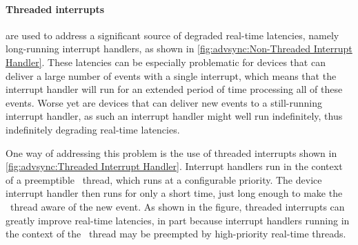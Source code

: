 
\paragraph{Threaded interrupts}
are used to address a significant source of degraded real-time latencies,
namely long-running interrupt handlers,
as shown in \cref{fig:advsync:Non-Threaded Interrupt Handler}.
These latencies can be especially problematic for devices that can
deliver a large number of events with a single interrupt, which means
that the interrupt handler will run for an extended period of time
processing all of these events.
Worse yet are devices that can deliver new events to a still-running
interrupt handler, as such an interrupt handler might well run
indefinitely, thus indefinitely degrading real-time latencies.


One way of addressing this problem is the use of threaded interrupts shown in
\cref{fig:advsync:Threaded Interrupt Handler}.
Interrupt handlers run in the context of a preemptible \IRQ\ thread,
which runs at a configurable priority.
The device interrupt handler then runs for only a short time, just
long enough to make the \IRQ\ thread aware of the new event.
As shown in the figure, threaded interrupts can greatly improve
real-time latencies, in part because interrupt handlers running in
the context of the \IRQ\ thread may be preempted by high-priority real-time
threads.

